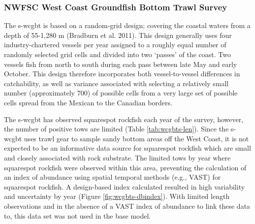 \documentclass[11pt,
  english,
  a4paper,
]{article}
\begin{document}
\leavevmode\tagmcend\tagstructend\par


\hypertarget{nwfsc-west-coast-groundfish-bottom-trawl-survey}{%
\subsubsection{NWFSC West Coast Groundfish Bottom Trawl Survey}\label{nwfsc-west-coast-groundfish-bottom-trawl-survey}}

\leavevmode\tagmcend\tagstructend


The \gls{s-wcgbt} is based on a random-grid design; covering the coastal waters from a depth of 55-1,280 m {(Bradburn et al. 2011)\leavevmode\tagmcend\tagstructend}. This design generally uses four industry-chartered vessels per year assigned to a roughly equal number of randomly selected grid cells and divided into two `passes' of the coast. Two vessels fish from north to south during each pass between late May and early October. This design therefore incorporates both vessel-to-vessel differences in catchability, as well as variance associated with selecting a relatively small number (approximately 700) of possible cells from a very large set of possible cells spread from the Mexican to the Canadian borders.

\leavevmode\tagmcend\tagstructend\par


The \gls{s-wcgbt} has observed squarespot rockfish each year of the survey, however, the number of positive tows are limited (Table \ref{tab:wcgbts-len}). Since the \Gls{s-wcgbt} uses trawl gear to sample sandy bottom areas off the West Coast, it is not expected to be an informative data source for squarespot rockfish which are small and closely associated with rock substrate. The limited tows by year where squarespot rockfish were observed within this area, preventing the calculation of an index of abundance using spatial temporal methods (e.g., VAST) for squarespot rockfish. A design-based index calculated resulted in high variability and uncertainty by year (Figure \ref{fig:wcgbts-dbindex}). With limited length observations and in the absence of a VAST index of abundance to link these data to, this data set was not used in the base model.
\end{document}
